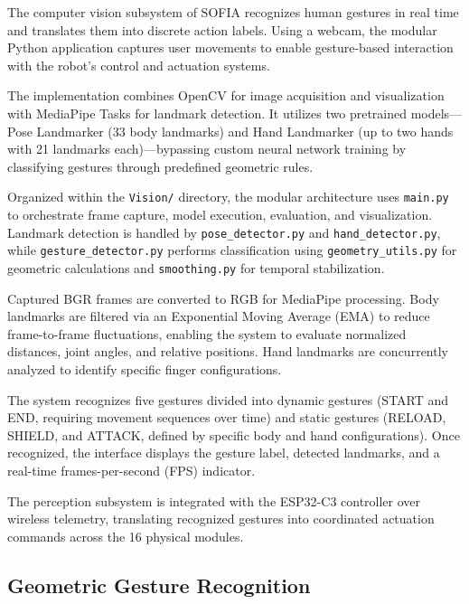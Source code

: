 \documentclass[lettersize,journal]{IEEEtran}
\begin{document}
	The computer vision subsystem of SOFIA recognizes human gestures in real time and translates them into discrete action labels. Using a webcam, the modular Python application captures user movements to enable gesture-based interaction with the robot's control and actuation systems.

	The implementation combines OpenCV for image acquisition and visualization with MediaPipe Tasks for landmark detection. It utilizes two pretrained models—Pose Landmarker (33 body landmarks) and Hand Landmarker (up to two hands with 21 landmarks each)—bypassing custom neural network training by classifying gestures through predefined geometric rules.
	
	Organized within the \texttt{Vision/} directory, the modular architecture uses \texttt{main.py} to orchestrate frame capture, model execution, evaluation, and visualization. Landmark detection is handled by \texttt{pose\_detector.py} and \texttt{hand\_detector.py}, while \texttt{gesture\_detector.py} performs classification using \texttt{geometry\_utils.py} for geometric calculations and \texttt{smoothing.py} for temporal stabilization.
	
	Captured BGR frames are converted to RGB for MediaPipe processing. Body landmarks are filtered via an Exponential Moving Average (EMA) to reduce frame-to-frame fluctuations, enabling the system to evaluate normalized distances, joint angles, and relative positions. Hand landmarks are concurrently analyzed to identify specific finger configurations.
	
	The system recognizes five gestures divided into dynamic gestures (START and END, requiring movement sequences over time) and static gestures (RELOAD, SHIELD, and ATTACK, defined by specific body and hand configurations). Once recognized, the interface displays the gesture label, detected landmarks, and a real-time frames-per-second (FPS) indicator.
	
	The perception subsystem is integrated with the ESP32-C3 controller over wireless telemetry, translating recognized gestures into coordinated actuation commands across the 16 physical modules.
	
	\subsection{Geometric Gesture Recognition}
	
\end{document}
